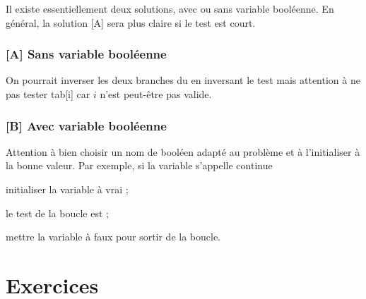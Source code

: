 Il existe essentiellement deux solutions, avec ou sans variable booléenne.
En général, la solution [A] sera plus claire si le test est court.

\subsubsection*{[A] Sans variable booléenne}


On pourrait inverser les deux branches du  en inversant le test
mais attention à ne pas tester tab[i] car $i$ n'est peut-être pas valide.

\subsubsection*{[B] Avec variable booléenne}


Attention à bien choisir un nom de booléen adapté au problème
et à l'initialiser à la bonne valeur. 
Par exemple, si la variable s'appelle \og{}continue\fg{}
\begin{liste}
\item initialiser la variable à vrai ;
\item le test de la boucle est \og{}\fg{} ;
\item mettre la variable à faux pour sortir de la boucle.
\end{liste}

	

\section{Exercices}

